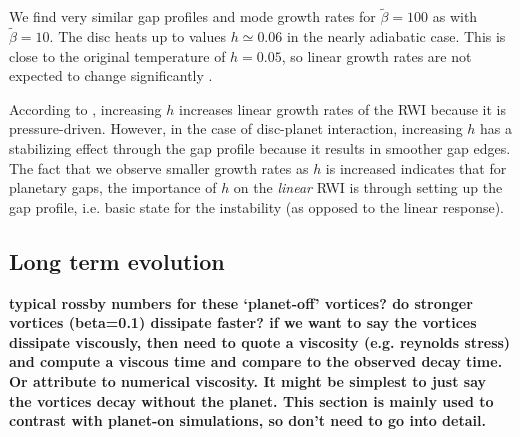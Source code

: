 We find very similar gap profiles and mode growth rates for
$\tilde{\beta}=100$ as with $\tilde{\beta}=10$. The disc heats up to
values $h\simeq0.06$ in the nearly adiabatic case. This is close to
the original temperature of $h=0.05$, so linear growth rates are not expected
to change significantly %
\citep{li00}. 

According to \cite{li00}, increasing $h$ increases linear growth rates
of the RWI because it is pressure-driven. However, in the case 
of disc-planet interaction, increasing $h$ has a stabilizing effect
through the gap profile because it results in smoother gap
edges. The fact that we observe smaller growth rates as $h$ is
increased indicates that for planetary gaps, the importance of $h$ on
the \emph{linear} RWI is through setting up the gap profile, i.e. basic
state for the instability (as opposed to the linear response). 






\subsection{Long term evolution} \label{nonlinearplanetoff} 
{\bf typical rossby numbers for these `planet-off' vortices? do
  stronger vortices (beta=0.1) dissipate faster? if we want to say the
  vortices dissipate viscously, then need to quote a viscosity
  (e.g. reynolds stress) and compute a viscous time and compare to the
  observed decay time. Or attribute to numerical viscosity. It might
  be simplest to just say the vortices decay without the planet. This
  section is mainly used to contrast with planet-on simulations, so
  don't need to go into detail. 
}

